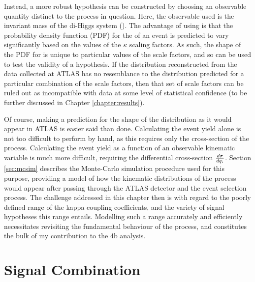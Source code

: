    Instead, a more robust hypothesis can be constructed by choosing an observable quantity distinct to the process in question.
    Here, the observable used is the invariant mass of the di-Higgs system (\mhh).
    The advantage of using \mhh is that the probability density function (PDF) for the \mhh of an event
        is predicted to vary significantly based on the values of the $\kappa$ scaling factors.
    As such, the shape of the PDF for \mhh is unique to particular values of the scale factors, 
        and so can be used to test the validity of a hypothesis.
    If the \mhh distribution reconstructed from the data collected at ATLAS has no resemblance to
        the \mhh distribution predicted for a particular combination of the scale factors,
        then that set of scale factors can be ruled out as incompatible with data
        at some level of statistical confidence
        (to be further discussed in Chapter \ref{chapter:results}).

    Of course, making a prediction for the shape of the \mhh distribution as it would appear in ATLAS is easier said than done.
    Calculating the event yield alone is not too difficult to perform by hand,
        as this requires only the cross-section of the process.
    Calculating the event yield as a function of an observable kinematic variable is much more difficult,
        requiring the differential cross-section $\frac{d \sigma}{d q_i}$.
    Section \ref{sec:mcsim} describes the Monte-Carlo simulation procedure used for this purpose,
        providing a model of how the kinematic distributions of the \vbfhhproc process would appear after passing through
        the ATLAS detector and the event selection process.
    The challenge addressed in this chapter then is with regard to the poorly defined range of the kappa coupling coefficients,
        and the variety of signal hypotheses this range entails.
    Modelling such a range accurately and efficiently necessitates revisiting the fundamental behaviour
        of the \hhproc process, and constitutes the bulk of my contribution to the 4b analysis.


\section{Signal Combination} \label{sec:signal_combination}

